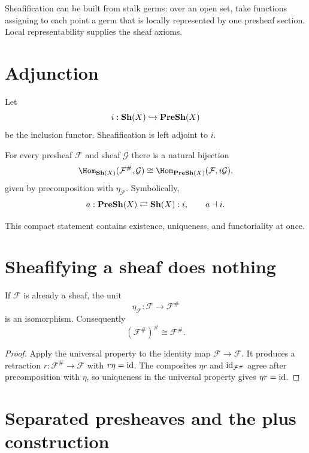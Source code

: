 \begin{example}\label{ex:vi14-expand-02}
Sheafification can be built from stalk germs: over an open set, take functions assigning to each point a germ that is locally represented by one presheaf section.  Local representability supplies the sheaf axioms.
\end{example}
\section{Adjunction}

Let
\[
i:\mathbf{Sh}(X)\hookrightarrow\mathbf{PreSh}(X)
\]
be the inclusion functor.  Sheafification is left adjoint to $i$.

\begin{theorem}[Adjunction]
For every presheaf $\mathcal F$ and sheaf $\mathcal G$ there is a natural bijection
\[
\Hom_{\Sh(X)}(\mathcal F^\#,\mathcal G)
\cong
\Hom_{\PreSh(X)}(\mathcal F,i\mathcal G),
\]
given by precomposition with $\eta_{\mathcal F}$.  Symbolically,
\[
a:\mathbf{PreSh}(X)\rightleftarrows\mathbf{Sh}(X):i,
\qquad a\dashv i.
\]
\end{theorem}



This compact statement contains existence, uniqueness, and functoriality at once.

\section{Sheafifying a sheaf does nothing}

\begin{corollary}[Idempotence]
If $\mathcal F$ is already a sheaf, the unit
\[
\eta_{\mathcal F}:\mathcal F\longrightarrow\mathcal F^\#
\]
is an isomorphism.  Consequently
\[
(\mathcal F^\#)^\#\cong\mathcal F^\#.
\]
\end{corollary}
\begin{proof}
Apply the universal property to the identity map $\mathcal F\to\mathcal F$.  It produces a
retraction $r:\mathcal F^\#\to\mathcal F$ with $r\eta=\operatorname{id}$.  The composites
$\eta r$ and $\operatorname{id}_{\mathcal F^\#}$ agree after precomposition with $\eta$, so uniqueness in
the universal property gives $\eta r=\operatorname{id}$.
\end{proof}

\section{Separated presheaves and the plus construction}

